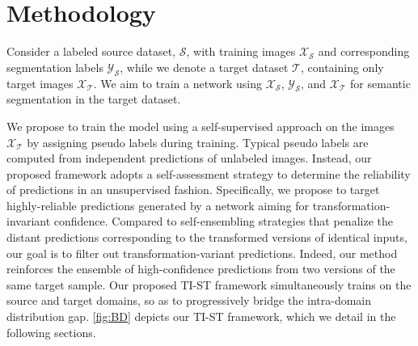 \section{Methodology}
\label{sec:tist_methodology}

Consider a labeled source dataset, $\mathcal{S}$, with training images $\mathcal{X_S}$ and corresponding segmentation labels $\mathcal{Y_S}$, while we denote a target dataset $\mathcal{T}$, containing only target images $\mathcal{X_T}$. We aim to train a network using $\mathcal{X_S}$, $\mathcal{Y_S}$, and $\mathcal{X_T}$ for semantic segmentation in the target dataset. 


We propose to train the model using a self-supervised approach on the images $\mathcal{X_T}$ by assigning pseudo labels during training. Typical pseudo labels are computed from independent predictions of unlabeled images. Instead, our proposed framework adopts a self-assessment strategy to determine the reliability of predictions in an unsupervised fashion. Specifically, we propose to target highly-reliable predictions generated by a network aiming for transformation-invariant confidence. Compared to self-ensembling strategies that penalize the distant predictions corresponding to the transformed versions of identical inputs, our goal is to filter out transformation-variant predictions. Indeed, our method reinforces the ensemble of high-confidence predictions from two versions of the same target sample. Our proposed TI-ST framework simultaneously trains on the source and target domains, so as to progressively bridge the intra-domain distribution gap. \cref{fig:BD} depicts our TI-ST framework, which we detail in the following sections. 



